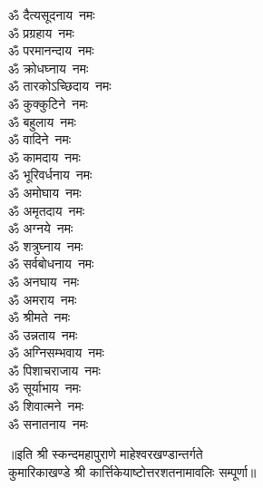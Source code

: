 \begin{multicols}{2}
\begin{flushleft}
ॐ दैत्यसूदनाय~नमः\\
ॐ प्रग्रहाय~नमः\\
ॐ परमानन्दाय~नमः\\
ॐ क्रोधघ्नाय~नमः\\
ॐ तारकोऽच्छिदाय~नमः\\
ॐ कुक्कुटिने~नमः\hfill{}\\
ॐ बहुलाय~नमः\\
ॐ वादिने~नमः\\
ॐ कामदाय~नमः\\
ॐ भूरिवर्धनाय~नमः\\
ॐ अमोघाय~नमः\\
ॐ अमृतदाय~नमः\\
ॐ अग्नये~नमः\\
ॐ शत्रुघ्नाय~नमः\\
ॐ सर्वबोधनाय~नमः\\
ॐ अनघाय~नमः\hfill{}\\
ॐ अमराय~नमः\\
ॐ श्रीमते~नमः\\
ॐ उन्नताय~नमः\\
ॐ अग्निसम्भवाय~नमः\\
ॐ पिशाचराजाय~नमः\\
ॐ सूर्याभाय~नमः\\
ॐ शिवात्मने~नमः\\
ॐ सनातनाय~नमः\\
\end{flushleft}
\end{multicols}
॥इति श्री स्कन्दमहापुराणे माहेश्वरखण्डान्तर्गते\\ कुमारिकाखण्डे श्री कार्त्तिकेयाष्टोत्तरशतनामावलिः सम्पूर्णा॥

